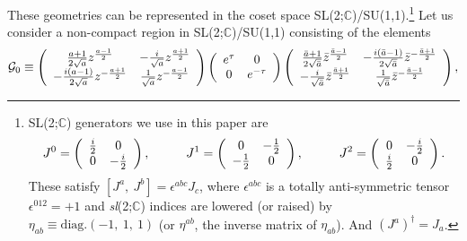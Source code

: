 \documentclass[a4paper,11pt]{article}
\begin{document}
These geometries can be represented in the coset space 
SL(2;$\mathbb{C}$)/SU(1,1).\footnote{
SL(2;$\mathbb{C}$) generators we use in this paper are 
\begin{eqnarray*}
 J^0=\left(\begin{array}{cc}
      \frac{i}{2} & 0 \\
      0 & -\frac{i}{2}
	   \end{array}\right), \hspace{10mm}
 J^1=\left(\begin{array}{cc}
      0 & -\frac{1}{2} \\
      -\frac{1}{2} & 0
	   \end{array}\right), \hspace{10mm}
 J^2=\left(\begin{array}{cc}
      0 & -\frac{i}{2} \\
      \frac{i}{2} & 0
	   \end{array}\right).
\end{eqnarray*}
These satisfy $\left[J^a, \ J^b\right]=\epsilon^{abc} J_c$, 
where $\epsilon^{abc}$ is a totally anti-symmetric tensor 
$\epsilon^{012}=+1$ and {\it sl}(2;$\mathbb{C}$) indices are lowered 
(or raised) by $\eta_{ab}\equiv \textrm{diag.}(-1, \ 1, \ 1)$ 
(or $\eta^{ab}$, the inverse matrix of $\eta_{ab}$).
And $\left(J^a\right)^\dagger = J_a$.
}
Let us consider a non-compact region in SL(2;$\mathbb{C}$)/SU(1,1) 
consisting of the elements 
\begin{eqnarray}
\label{cal-G_0}
{\cal G}_0\equiv
 \left(\begin{array}{cc}
  \frac{a+1}{2\sqrt{a}}z^{\frac{a-1}{2}} & 
    -\frac{i}{\sqrt{a}}z^{\frac{a+1}{2}} \\
  -\frac{i(a-1)}{2\sqrt{a}}z^{-\frac{a+1}{2}} & 
    \frac{1}{\sqrt{a}}z^{-\frac{a-1}{2}}
       \end{array}\right)
 \left(\begin{array}{cc}
  e^{\tau} &  0 \\
  0 & e^{-\tau}
       \end{array}\right)
 \left(\begin{array}{cc}
  \frac{\bar{a}+1}{2\sqrt{\bar{a}}}\bar{z}^{\frac{\bar{a}-1}{2}} & 
    -\frac{i(\bar{a}-1)}{2\sqrt{\bar{a}}}\bar{z}^{-\frac{\bar{a}+1}{2}} \\
  -\frac{i}{\sqrt{\bar{a}}}\bar{z}^{\frac{\bar{a}+1}{2}} & 
    \frac{1}{\sqrt{\bar{a}}}\bar{z}^{-\frac{\bar{a}-1}{2}}
       \end{array}\right),
\end{eqnarray} 
\end{document}
